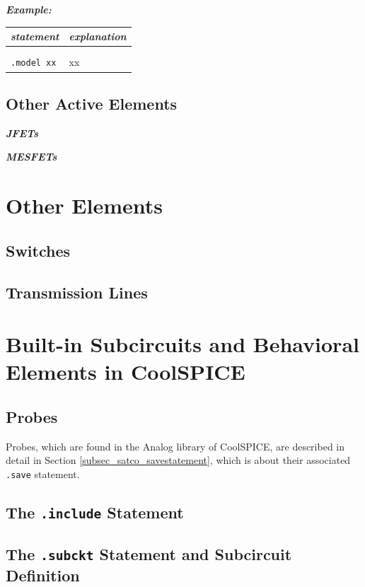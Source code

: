 \textbf{\textit{Example:}}

\begin{longtable}{l l}
\textit{statement} & \textit{explanation} \\ \hline \\ %
			\begin{minipage}{15em}{\texttt{xx}\\ 
			\texttt{.model xx}}\end{minipage}
			& \begin{minipage}{15em}{{\small xx}}\end{minipage} 
\end{longtable}


\subsection{Other Active Elements}
\label{subsec_sceadm_otheractiveelements}

\textbf{\textit{JFETs}}


\textbf{\textit{MESFETs}}



\section{Other Elements}
\label{sec_sceadm_otherelements}

\subsection{Switches}
\label{subsec_sceadm_switches}

\subsection{Transmission Lines}
\label{subsec_sceadm_transmissionlines}

\section{Built-in Subcircuits and Behavioral Elements in CoolSPICE}
\label{sec_sceadm_builtinsubcircuits}

\subsection{Probes}
\label{subsec_sceadm_probes}

Probes, which are found in the \textsf{Analog} library of CoolSPICE, are described in detail in Section \ref{subsec_satco_savestatement}, which is about their associated \texttt{.save} statement.  

\subsection{The \texttt{.include} Statement}
\label{sec_sceadm_includestatement}

\subsection{The \texttt{.subckt} Statement and Subcircuit Definition}
\label{sec_sceadm_subcktstatement}

